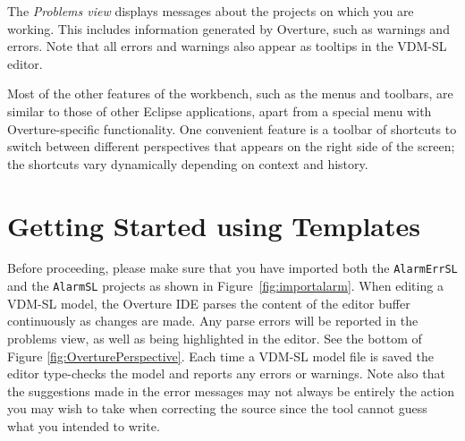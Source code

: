 {The \emph{Problems view} displays messages about the projects on which
you are working. This includes information generated by Overture, such
as warnings and errors. Note that all errors and warnings also appear
as tooltips in the VDM-SL editor.

Most of the other features of the workbench, such as the menus and
toolbars, are similar to those of other Eclipse applications, apart
from a special menu with Overture-specific functionality. One
convenient feature is a toolbar of shortcuts to switch between
different perspectives that appears on the right side of the screen;
the shortcuts vary dynamically depending on context and history.

\section{Getting Started using Templates}\label{sec:templates}

Before proceeding, please make sure that you have imported both the
\texttt{AlarmErrSL} and the \texttt{AlarmSL} projects as shown in
Figure~\ref{fig:importalarm}. 
When editing a VDM-SL model, the Overture IDE parses the content of the
editor buffer continuously as changes are made. Any parse errors will
be reported in the problems view, as well as being highlighted in the
editor. See the bottom of Figure
\ref{fig:OverturePerspective}. Each time a VDM-SL model file is
saved the editor type-checks the model and reports any errors or
warnings. Note also that the suggestions made in the error messages
may not always be entirely the action you may wish to take when
correcting the source since the tool cannot guess what you intended
to write.

}
